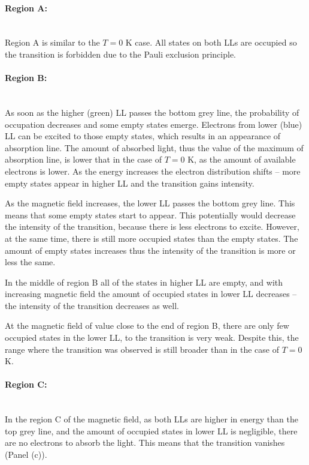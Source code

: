 \documentclass[titlepage,a4paper]{book}
\newcommand{\wciecie}{\quad\phantom{v}}
\newcommand{\myparagraph}[1]{\paragraph{#1}\mbox{}\\}
\begin{document}
\myparagraph{Region A:}
\wciecie
Region A is similar to the $T = 0$ K case. All states on both LLs are occupied so the transition is forbidden due to the Pauli exclusion principle. 

\myparagraph{Region B:}
\wciecie
As soon as the higher (green) LL passes the bottom grey line, the probability of occupation decreases and some empty states emerge. Electrons from lower (blue) LL can be excited to those empty states, which results in an appearance of absorption line. The amount of absorbed light, thus the value of the maximum of absorption line, is lower that in the case of $T = 0$ K, as the amount of available electrons is lower. As the energy increases the electron distribution shifts -- more empty states appear in higher LL and the transition gains intensity. 

As the magnetic field increases, the lower LL passes the bottom grey line. This means that some empty states start to appear. This potentially would decrease the intensity of the transition, because there is less electrons to excite. However, at the same time, there is still more occupied states than the empty states. The amount of empty states increases thus the intensity of the transition is more or less the same.

In the middle of region B all of the states in higher LL are empty, and with increasing magnetic field the amount of occupied states in lower LL decreases -- the intensity of the transition decreases as well.

At the magnetic field of value close to the end of region B, there are only few occupied states in the lower LL, to the transition is very weak. Despite this, the range where the transition was observed is still broader than in the case of $T = 0$ K.

\myparagraph{Region C:}
\wciecie
In the region C of the magnetic field, as both LLs are higher in energy than the top grey line, and the amount of occupied states in lower LL is negligible, there are no electrons to absorb the light. This means that the transition vanishes (Panel (c)).
\end{document}
